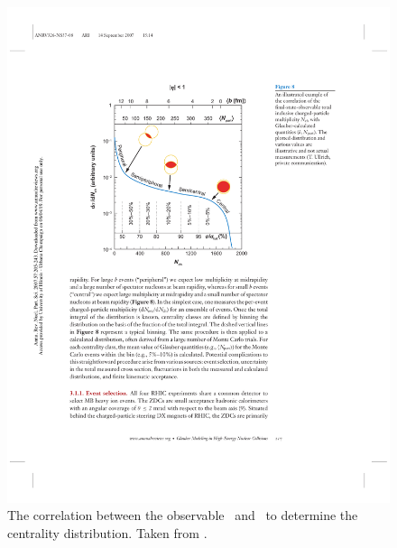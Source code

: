 \begin{figure}
\begin{center}
\begin{minipage}[b]{0.4\textwidth}
\includegraphics[width=\textwidth]{figures/theory/cent_estimate}
\caption{The correlation between the observable \Nch\ and \Npart\ to determine the centrality distribution.
Taken from \cite{doi:10.1146/annurev.nucl.57.090506.123020}.}
\label{fig:cent_estimate}
  \end{minipage}
  \end{center}
\end{figure}










